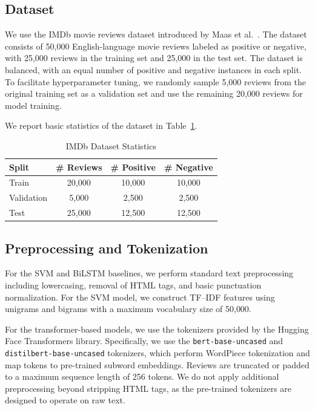\documentclass[conference]{IEEEtran}
\begin{document}
\subsection{Dataset}
We use the IMDb movie reviews dataset introduced by Maas et al.~\cite{maas2011learning}. The dataset consists of 50{,}000 English-language movie reviews labeled as positive or negative, with 25{,}000 reviews in the training set and 25{,}000 in the test set. The dataset is balanced, with an equal number of positive and negative instances in each split. To facilitate hyperparameter tuning, we randomly sample 5{,}000 reviews from the original training set as a validation set and use the remaining 20{,}000 reviews for model training.

We report basic statistics of the dataset in Table~\ref{tab:dataset_stats}.

\begin{table}[htbp]
\caption{IMDb Dataset Statistics}
\label{tab:dataset_stats}
\centering
\begin{tabular}{lccc}
\toprule
\textbf{Split} & \textbf{\# Reviews} & \textbf{\# Positive} & \textbf{\# Negative} \\
\midrule
Train & 20{,}000 & 10{,}000 & 10{,}000 \\
Validation & 5{,}000 & 2{,}500 & 2{,}500 \\
Test & 25{,}000 & 12{,}500 & 12{,}500 \\
\bottomrule
\end{tabular}
\end{table}

\subsection{Preprocessing and Tokenization}
For the SVM and BiLSTM baselines, we perform standard text preprocessing including lowercasing, removal of HTML tags, and basic punctuation normalization. For the SVM model, we construct TF--IDF features using unigrams and bigrams with a maximum vocabulary size of 50{,}000.

For the transformer-based models, we use the tokenizers provided by the Hugging Face Transformers library. Specifically, we use the \texttt{bert-base-uncased} and \texttt{distilbert-base-uncased} tokenizers, which perform WordPiece tokenization and map tokens to pre-trained subword embeddings. Reviews are truncated or padded to a maximum sequence length of 256 tokens. We do not apply additional preprocessing beyond stripping HTML tags, as the pre-trained tokenizers are designed to operate on raw text.
\end{document}
